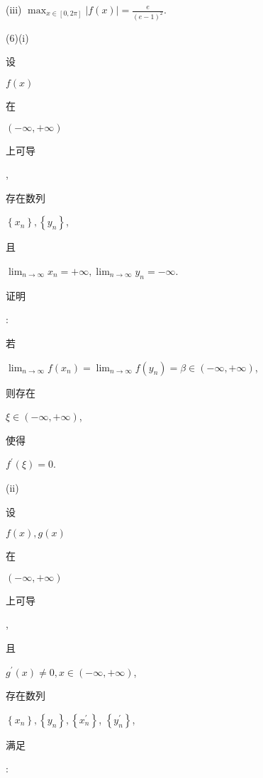 \documentclass[10pt]{article}
\begin{document}
(iii) $\max _{x \in[0,2 \pi]}|f(x)|=\frac{e}{(e-1)^{2}}$.

(6)(i) \begin{CJK}{UTF8}{mj}设\end{CJK} $f(x)$ \begin{CJK}{UTF8}{mj}在\end{CJK} $(-\infty,+\infty)$ \begin{CJK}{UTF8}{mj}上可导\end{CJK}, \begin{CJK}{UTF8}{mj}存在数列\end{CJK} $\left\{x_{n}\right\},\left\{y_{n}\right\}$, \begin{CJK}{UTF8}{mj}且\end{CJK} $\lim _{n \rightarrow \infty} x_{n}=+\infty, \lim _{n \rightarrow \infty} y_{n}=-\infty$. \begin{CJK}{UTF8}{mj}证明\end{CJK}: \begin{CJK}{UTF8}{mj}若\end{CJK} $\lim _{n \rightarrow \infty} f\left(x_{n}\right)=\lim _{n \rightarrow \infty} f\left(y_{n}\right)=\beta \in(-\infty,+\infty)$, \begin{CJK}{UTF8}{mj}则存在\end{CJK} $\xi \in(-\infty,+\infty)$, \begin{CJK}{UTF8}{mj}使得\end{CJK} $f^{\prime}(\xi)=0$.

(ii) \begin{CJK}{UTF8}{mj}设\end{CJK} $f(x), g(x)$ \begin{CJK}{UTF8}{mj}在\end{CJK} $(-\infty,+\infty)$ \begin{CJK}{UTF8}{mj}上可导\end{CJK}, \begin{CJK}{UTF8}{mj}且\end{CJK} $g^{\prime}(x) \neq 0, x \in(-\infty,+\infty)$, \begin{CJK}{UTF8}{mj}存在数列\end{CJK} $\left\{x_{n}\right\},\left\{y_{n}\right\},\left\{x_{n}^{\prime}\right\}$, $\left\{y_{n}^{\prime}\right\}$, \begin{CJK}{UTF8}{mj}满足\end{CJK}:
\end{document}
